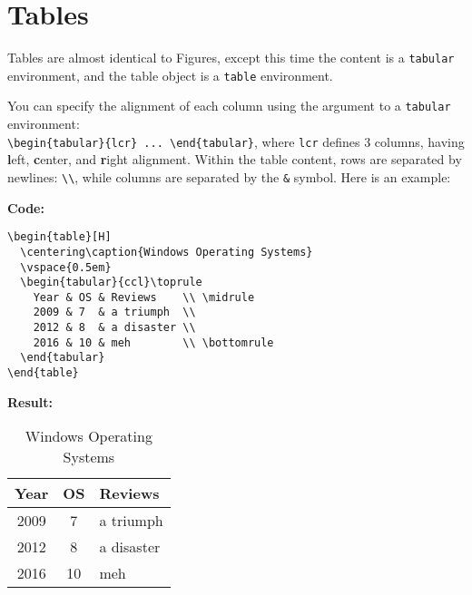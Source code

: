 \section{Tables}
Tables are almost identical to Figures, except this time the content is a \lstinline|tabular| environment,
and the table object is a \lstinline|table| environment.
\par
You can specify the alignment of each column using the argument to a \lstinline|tabular| environment:\\
\lstinline|\begin{tabular}{lcr} ... \end{tabular}|, where \lstinline|lcr| defines 3 columns, having
\textbf{l}eft, \textbf{c}enter, and \textbf{r}ight alignment.
Within the table content,
rows are separated by newlines: \lstinline|\\|, while
columns are separated by the \lstinline|&| symbol.
Here is an example:
\par
\textbf{Code:}
\begin{lstlisting}
\begin{table}[H]
  \centering\caption{Windows Operating Systems}
  \vspace{0.5em}
  \begin{tabular}{ccl}\toprule
  	Year & OS & Reviews    \\ \midrule
  	2009 & 7  & a triumph  \\
  	2012 & 8  & a disaster \\
  	2016 & 10 & meh        \\ \bottomrule
  \end{tabular}
\end{table}
\end{lstlisting}
\clearpage
\textbf{Result:}
\begin{table}[H]
  \centering\caption{Windows Operating Systems}
  \vspace{0.5em}
  \begin{tabular}{ccl}\toprule
  	Year & OS & Reviews    \\ \midrule
  	2009 & 7  & a triumph  \\
  	2012 & 8  & a disaster \\
  	2016 & 10 & meh        \\ \bottomrule
  \end{tabular}
\end{table}
